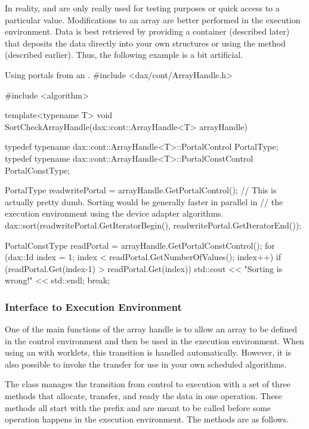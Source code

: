 In reality,  and
 are only really used for testing purposes
or quick access to a particular value. Modifications to an array are better
performed in the execution environment. Data is best retrieved by providing
a container (described later) that deposits the data directly into your own
structures or using the  method (described
earlier). Thus, the following example is a bit artificial.

\begin{daxexample}{Using portals from an .}
#include <dax/cont/ArrayHandle.h>

#include <algorithm>

template<typename T>
void SortCheckArrayHandle(dax::cont::ArrayHandle<T> arrayHandle)
{
  typedef typename dax::cont::ArrayHandle<T>::PortalControl PortalType;
  typedef typename dax::cont::ArrayHandle<T>::PortalConstControl PortalConstType;

  PortalType readwritePortal = arrayHandle.GetPortalControl();
  // This is actually pretty dumb. Sorting would be generally faster in parallel in
  // the execution environment using the device adapter algorithms.
  dax::sort(readwritePortal.GetIteratorBegin(), readwritePortal.GetIteratorEnd());

  PortalConstType readPortal = arrayHandle.GetPortalConstControl();
  for (dax::Id index = 1; index < readPortal.GetNumberOfValues(); index++)
    {
    if (readPortal.Get(index-1) > readPortal.Get(index))
      {
      std::cout << "Sorting is wrong!" << std::endl;
      break;
      }
    }
}
\end{daxexample}


\subsubsection{Interface to Execution Environment}
\label{sec:ArrayHandleInterfaceToExecutionEnvironment}

One of the main functions of the array handle is to allow an array to be
defined in the control environment and then be used in the execution
environment. When using an  with worklets, this
transition is handled automatically. However, it is also possible to invoke
the transfer for use in your own scheduled algorithms.

The  class manages the transition from control
to execution with a set of three methods that allocate, transfer, and ready
the data in one operation. These methods all start with the prefix
 and are meant to be called before some operation happens
in the execution environment. The methods are as follows.

